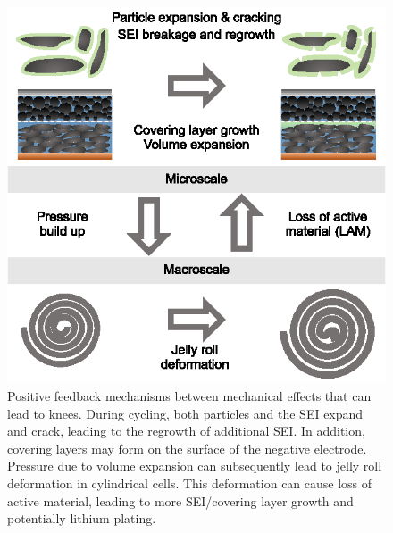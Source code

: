 \documentclass[journal=jpclcd,manuscript=article]{achemso}
\begin{document}
\begin{figure}[hp]
\centering
\includegraphics[scale = 1]{figures/mechanical.eps}
\caption{Positive feedback mechanisms between mechanical effects that can lead to knees. During cycling, both particles and the SEI expand and crack, leading to the regrowth of additional SEI. In addition, covering layers may form on the surface of the negative electrode. Pressure due to volume expansion can subsequently lead to jelly roll deformation in cylindrical cells. This deformation can cause loss of active material, leading to more SEI/covering layer growth and potentially lithium plating.}
\label{fig:knee_mechanical}
\end{figure}
\end{document}
